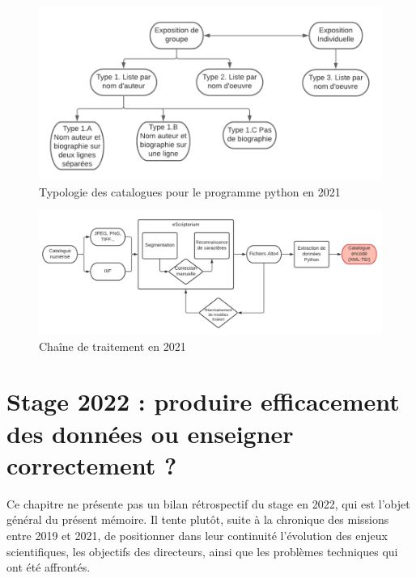\documentclass[a4paper,12pt,twoside]{book}
\begin{document}
\begin{figure}
	\centering
	\includegraphics[scale=0.6]{typologie_JJanes}
	\caption{Typologie des catalogues pour le programme python en 2021}
	\label{typologie}
\end{figure}
\begin{figure}
	\centering
	\includegraphics[scale=0.6]{chaine2021}
	\caption{Chaîne de traitement en 2021}
	\label{2021}
\end{figure}





	\chapter{Stage 2022 : produire efficacement des données ou enseigner correctement ?}
Ce chapitre ne présente pas un bilan rétrospectif du stage en 2022, qui est l'objet général du présent mémoire. Il tente plutôt, suite à la chronique des missions entre 2019 et 2021, de positionner dans leur continuité l'évolution des enjeux scientifiques, les objectifs des directeurs, ainsi que les problèmes techniques qui ont été affrontés.
\end{document}

